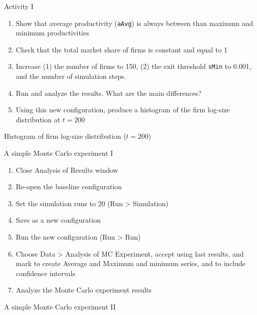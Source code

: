 \documentclass[bigger,aspectratio=169]{beamer}
\begin{document}
\begin{frame}[label={sec:org10fc1c1},fragile]{Activity I}
 \begin{enumerate}
\item Show that average productivity (\texttt{aAvg}) is always between than maximum and minimum productivities
\item Check that the total market share of firms is constant and equal to 1
\item Increase (1) the number of firms to 150, (2) the exit threshold \texttt{sMin} to 0.001, and the number of simulation steps.
\item Run and analyze the results. What are the main differences?
\item Using this new configuration, produce a \alert{histogram} of the firm log-size distribution at \(t = 200\)
\end{enumerate}
\end{frame}
\begin{frame}[label={sec:org79bd856}]{Histogram of firm log-size distribution (\(t = 200\))}
\begin{center}

\end{center}
\end{frame}
\begin{frame}[label={sec:org9d5adae}]{A simple Monte Carlo experiment I}
\begin{enumerate}
\item Close Analysis of Results window
\item Re-open the baseline configuration
\item Set the simulation runs to \alert{20} (\alert{Run > Simulation})
\item Save as a new configuration
\item Run the new configuration (\alert{Run > Run})
\item Choose \alert{Data > Analysis of MC Experiment}, accept using last results, and mark to create \alert{Average} and \alert{Maximum and minimum} series, and to include confidence intervals
\item Analyze the Monte Carlo experiment results
\end{enumerate}
\end{frame}
\begin{frame}[label={sec:org9a9b688}]{A simple Monte Carlo experiment II}
\begin{center}

\end{center}
\end{frame}
\end{document}
